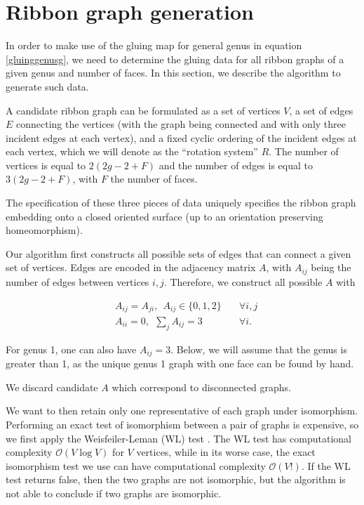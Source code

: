 \documentclass[12pt]{article}
\def\ie{\begin{equation}\begin{aligned}}
\def\fe{\end{aligned}\end{equation}}
\numberwithin{equation}{section}
\begin{document}
\appendix

\section{Ribbon graph generation}
\label{app:ribbonGraphGeneration}

In order to make use of the gluing map for general genus in equation \eqref{gluinggenusg}, we need to determine the gluing data for all ribbon graphs of a given genus and number of faces. In this section, we describe the algorithm to generate such data.

A candidate ribbon graph can be formulated as a set of vertices $V$, a set of edges $E$ connecting the vertices (with the graph being connected and with only three incident edges at each vertex), and a fixed cyclic ordering of the incident edges at each vertex, which we will denote as the ``rotation system'' $R$. The number of vertices is equal to $2(2g-2+F)$ and the number of edges is equal to $3(2g-2+F)$, with $F$ the number of faces.

The specification of these three pieces of data uniquely specifies the ribbon graph embedding onto a closed oriented surface (up to an orientation preserving homeomorphism).

Our algorithm first constructs all possible sets of edges that can connect a given set of vertices. Edges are encoded in the adjacency matrix $A$, with $A_{ij}$ being the number of edges between vertices $i,j$. Therefore, we construct all possible $A$ with

\ie
&A_{ij}=A_{ji},~~A_{ij}\in \{0,1,2\} \quad &\forall i,j\\
&A_{ii}=0,~~\sum_j A_{ij}=3 \quad &\forall i.
\fe

For genus 1, one can also have $A_{ij}= 3$. Below, we will assume that the genus is greater than 1, as the unique genus 1 graph with one face can be found by hand.

We discard candidate $A$ which correspond to disconnected graphs. 

We want to then retain only one representative of each graph under isomorphism. Performing an exact test of isomorphism between a pair of graphs is expensive, so we first apply the Weisfeiler-Leman (WL) test \cite{WeisfeilerLeman:1968, Shervashidze:2011WL}. The WL test has computational complexity $\mathcal{O}( V\log V)$ for $V$ vertices, while in its worse case, the exact isomorphism test we use can have computational complexity $\mathcal{O}(V!)$. If the WL test returns false, then the two graphs are not isomorphic, but the algorithm is not able to conclude if two graphs are isomorphic.
\end{document}

